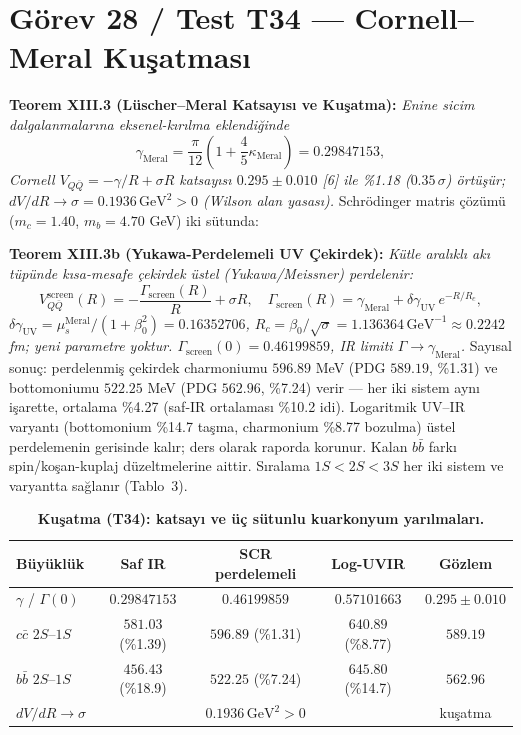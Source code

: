 \documentclass[12pt,a4paper]{article}
\begin{document}
\section{Görev 28 / Test T34 --- Cornell--Meral Kuşatması}

\textbf{Teorem XIII.3 (Lüscher--Meral Katsayısı ve Kuşatma):} \textit{Enine
sicim dalgalanmalarına eksenel-kırılma eklendiğinde}
\begin{equation}
\boxed{\gamma_{\mathrm{Meral}}=\frac{\pi}{12}
\left(1+\frac{4}{5}\kappa_{\mathrm{Meral}}\right)=0.29847153,}
\end{equation}
\textit{Cornell $V_{Q\bar{Q}}=-\gamma/R+\sigma R$ katsayısı
$0.295\pm 0.010$ [6] ile \%1.18 ($0.35\,\sigma$) örtüşür;
$dV/dR\to\sigma=0.1936\,\mathrm{GeV}^2>0$ (Wilson alan yasası).}
Schrödinger matris çözümü ($m_c=1.40$, $m_b=4.70$ GeV) iki sütunda:

\textbf{Teorem XIII.3b (Yukawa-Perdelemeli UV Çekirdek):}
\textit{Kütle aralıklı akı tüpünde kısa-mesafe çekirdek üstel (Yukawa/Meissner)
perdelenir:}
\begin{equation}
\boxed{V_{Q\bar{Q}}^{\mathrm{screen}}(R)=-\frac{\Gamma_{\mathrm{screen}}(R)}{R}
+\sigma R,\quad
\Gamma_{\mathrm{screen}}(R)=\gamma_{\mathrm{Meral}}
+\delta\gamma_{\mathrm{UV}}\,e^{-R/R_c},}
\end{equation}
\textit{$\delta\gamma_{\mathrm{UV}}=\mu_s^{\mathrm{Meral}}/(1+\beta_0^2)
=0.16352706$, $R_c=\beta_0/\sqrt{\sigma}=1.136364\,\mathrm{GeV}^{-1}
\approx 0.2242$ fm; yeni parametre yoktur.
$\Gamma_{\mathrm{screen}}(0)=0.46199859$, IR limiti
$\Gamma\to\gamma_{\mathrm{Meral}}$.}
Sayısal sonuç: perdelenmiş çekirdek charmoniumu $596.89$ MeV
(PDG $589.19$, \%1.31) ve bottomoniumu $522.25$ MeV (PDG $562.96$, \%7.24)
verir --- her iki sistem aynı işarette, ortalama \%4.27 (saf-IR ortalaması
\%10.2 idi). Logaritmik UV--IR varyantı (bottomonium \%14.7 taşma, charmonium
\%8.77 bozulma) üstel perdelemenin gerisinde kalır; ders olarak raporda
korunur. Kalan $b\bar{b}$ farkı spin/koşan-kuplaj düzeltmelerine aittir.
Sıralama $1S<2S<3S$ her iki sistem ve varyantta sağlanır (Tablo~3).

\begin{table}[!htbp]
\centering\footnotesize
\setlength{\tabcolsep}{3pt}
\caption{\textbf{Kuşatma (T34): katsayı ve üç sütunlu kuarkonyum yarılmaları.}}
\label{tab:conf}
\vspace{0.1cm}
\begin{tabular}{@{}l|c|c|c|c@{}}
\toprule
Büyüklük & Saf IR & SCR perdelemeli & Log-UVIR & Gözlem \\
\midrule
$\gamma$ / $\Gamma(0)$ & $0.29847153$ & $0.46199859$ & $0.57101663$ & $0.295\pm 0.010$ \\
$c\bar{c}$ $2S$--$1S$ & $581.03$ (\%1.39) & $596.89$ (\%1.31) & $640.89$ (\%8.77) & $589.19$ \\
$b\bar{b}$ $2S$--$1S$ & $456.43$ (\%18.9) & $522.25$ (\%7.24) & $645.80$ (\%14.7) & $562.96$ \\
$dV/dR\to\sigma$ & \multicolumn{3}{c|}{$0.1936\,\mathrm{GeV}^2>0$} & kuşatma \\
\bottomrule
\end{tabular}
\end{table}
\end{document}
